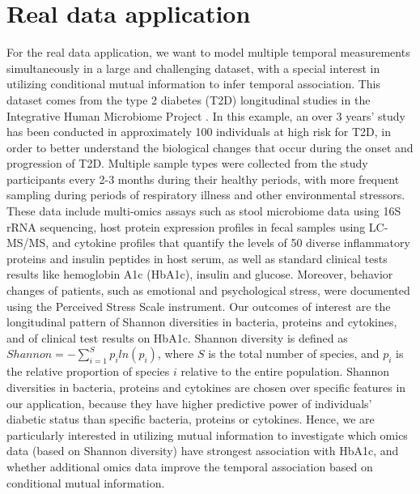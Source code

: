 \documentclass[aoas,preprint]{imsart}
\begin{document}
\section{Real data application}
For the real data application, we want to model multiple temporal measurements simultaneously in a large and challenging dataset, with a special interest in utilizing conditional mutual information to infer temporal association. This dataset comes from the type 2 diabetes (T2D) longitudinal studies in the Integrative Human Microbiome Project \citep{integrative2014integrative}. In this example, an over 3 years' study has been conducted in approximately 100 individuals at high risk for T2D, in order to better understand the biological changes that occur during the onset and progression of T2D. Multiple sample types were collected from the study participants every 2-3 months during their healthy periods, with more frequent sampling during periods of respiratory illness and other environmental stressors. These data include multi-omics assays such as stool microbiome data using 16S rRNA sequencing, host protein expression profiles in fecal samples using LC-MS/MS, and cytokine profiles that quantify the levels of 50 diverse inflammatory proteins and insulin peptides in host serum, as well as standard clinical tests results like hemoglobin A1c (HbA1c), insulin and glucose. Moreover, behavior changes of patients, such as emotional and psychological stress, were documented using the Perceived Stress Scale instrument. Our outcomes of interest are the longitudinal pattern of Shannon diversities in bacteria, proteins and cytokines, and of clinical test results on HbA1c. Shannon diversity is defined as $Shannon = - \sum_{i=1}^{S} p_i ln(p_i) $, where $S$ is the total number of species, and $p_i$ is the relative proportion of species $i$ relative to the entire population. Shannon diversities in bacteria, proteins and cytokines are chosen over specific features in our application, because they have higher predictive power of individuals' diabetic status than specific bacteria, proteins or cytokines. Hence, we are particularly interested in utilizing mutual information to investigate which omics data (based on Shannon diversity) have strongest association with HbA1c, and whether additional omics data improve the temporal association based on conditional mutual information. 
\end{document}
